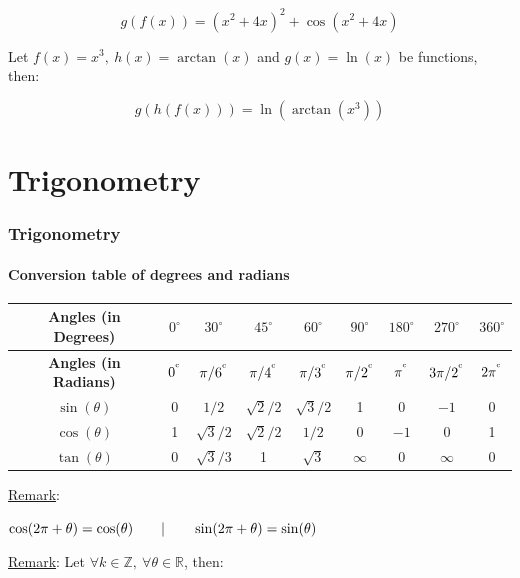 \documentclass{article}
\begin{document}
\[g(f(x))=\left(x^2+4x\right)^2+\cos(x^2+4x)\]

Let $f(x)=x^3,\ h(x)=\arctan(x)$ and $g(x)=\ln(x)$ be functions, then:

\[
  g(h(f(x)))=\ln(\arctan(x^3))
\]

\newpage
\part{Trigonometry}
\section{Trigonometry}
\subsection{Conversion table of degrees and radians}
\begin{center}
    \begin{tabular}{|c|c|c|c|c|c|c|c|c|}
        \hline
        \textbf{Angles (in Degrees)} & \rule{0pt}{15pt} $0^\circ$ & $30^\circ$ & $45^\circ$ & $60^\circ$ & $90^\circ$ & $180^\circ$ & $270^\circ$ & $360^\circ$ \\
        \hline
        \textbf{Angles (in Radians)} & \rule{0pt}{15pt} $0^{^{\mathrm{c}}}$ & $\pi/6^{^{\mathrm{c}}}$ & $\pi/4^{^{\mathrm{c}}}$ & $\pi/3^{^{\mathrm{c}}}$ & $\pi/2^{^{\mathrm{c}}}$ & $\pi^{^{\mathrm{c}}}$ & $3\pi/2^{^{\mathrm{c}}}$ & $2\pi^{^{\mathrm{c}}}$ \\
        \hline
        $\sin(\theta)$ & \rule{0pt}{15pt} 0 & $1/2$ & $\sqrt{2}/2$ & $\sqrt{3}/2$ & 1 & 0 & $-1$ & 0 \\
        \hline
        $\cos(\theta)$ & \rule{0pt}{15pt} 1 & $\sqrt{3}/2$ & $\sqrt{2}/2$ & $1/2$ & 0 & $-1$ & 0 & 1 \\
        \hline
        $\tan(\theta)$ & \rule{0pt}{15pt} 0 & $\sqrt{3}/3$ & 1 & $\sqrt{3}$ & $\infty$ & 0 & $\infty$ & 0 \\
        \hline
    \end{tabular}
\end{center}
\phantom{}

\underline{Remark}:

\begin{center}
    $\displaystyle \cos(2\pi+\theta) = \cos(\theta) \qquad | \qquad
    \sin(2\pi+\theta) = \sin(\theta)$
\end{center}

\underline{Remark}:
Let $\forall k \in \mathbb{Z},\ \forall \theta \in \mathbb{R}$, then:
\end{document}
